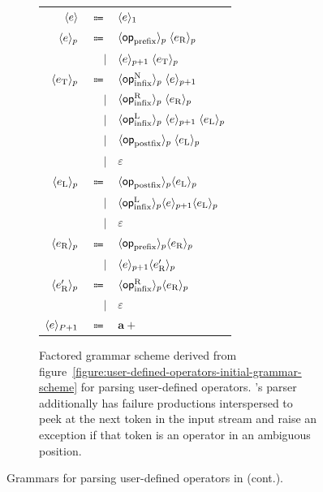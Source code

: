 \begin{figure}\ContinuedFloat
\begin{subfigure}{\linewidth}
\centering
\begin{tabular}{rrl}
$ \langle e\rangle $ & $ \Coloneqq $ & $ \langle e\rangle_1 $\\
$ \langle e\rangle_p $ & $ \Coloneqq $ & $ \langle\mathsf{op}_{\text{prefix}}\rangle_p \; \langle e_\text{R}\rangle_p $\\
& $ \mid $ & $ \langle e\rangle_{p + 1} \; \langle e_\text{T}\rangle_p $\\
$ \langle e_\text{T}\rangle_p $ & $ \Coloneqq $ & $ \langle\mathsf{op}_{\text{infix}}^\text{N}\rangle_p \; \langle e\rangle_{p + 1} $\\
& $ \mid $ & $ \langle\mathsf{op}_{\text{infix}}^\text{R}\rangle_p \; \langle e_\text{R}\rangle_p $\\
& $ \mid $ & $ \langle\mathsf{op}_{\text{infix}}^\text{L}\rangle_p \; \langle e\rangle_{p + 1} \; \langle e_\text{L}\rangle_p $\\
& $ \mid $ & $ \langle\mathsf{op}_{\text{postfix}}\rangle_p \; \langle e_\text{L}\rangle_p $\\
& $ \mid $ & $ \varepsilon $\\
$ \langle e_\text{L}\rangle_p $ & $ \Coloneqq $ & $ \langle\mathsf{op}_{\text{postfix}}\rangle_p \langle e_\text{L}\rangle_p $\\
& $ \mid $ & $ \langle\mathsf{op}_{\text{infix}}^\text{L}\rangle_p \langle e\rangle_{p + 1} \langle e_\text{L}\rangle_p $\\
& $ \mid $ & $ \varepsilon $\\
$ \langle e_\text{R}\rangle_p $ & $ \Coloneqq $ & $ \langle\mathsf{op}_{\text{prefix}}\rangle_p \langle e_\text{R}\rangle_p $\\
& $ \mid $ & $ \langle e\rangle_{p + 1} \langle e_\text{R}'\rangle_p $\\
$ \langle e_\text{R}'\rangle_p $ & $ \Coloneqq $ & $ \langle\mathsf{op}_{\text{infix}}^\text{R}\rangle_p \langle e_\text{R}\rangle_p $\\
& $ \mid $ & $ \varepsilon $\\
$ \langle e\rangle_{P + 1} $ & $ \Coloneqq $ & $ \mathbf{a}+ $
\end{tabular}
\caption{Factored grammar scheme derived from figure~\ref{figure:user-defined-operators-initial-grammar-scheme} for parsing user-defined operators.
\Beluga's parser additionally has failure productions interspersed to peek at the next token in the input stream and raise an exception if that token is an operator in an ambiguous position.}
\label{figure:user-defined-operators-final-grammar-scheme}
\end{subfigure}
\caption[]{Grammars for parsing user-defined operators in \Beluga (cont.).}
\end{figure}

\clearpage

